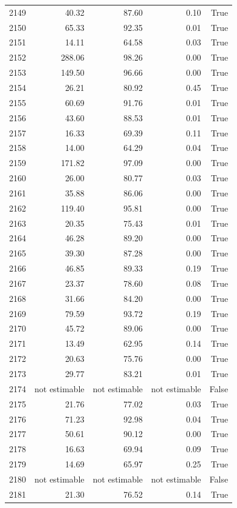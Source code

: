 \begin{longtable}{rrrrr}
2149 & 40.32 & 87.60 & 0.10 & True \\
2150 & 65.33 & 92.35 & 0.01 & True \\
2151 & 14.11 & 64.58 & 0.03 & True \\
2152 & 288.06 & 98.26 & 0.00 & True \\
2153 & 149.50 & 96.66 & 0.00 & True \\
2154 & 26.21 & 80.92 & 0.45 & True \\
2155 & 60.69 & 91.76 & 0.01 & True \\
2156 & 43.60 & 88.53 & 0.01 & True \\
2157 & 16.33 & 69.39 & 0.11 & True \\
2158 & 14.00 & 64.29 & 0.04 & True \\
2159 & 171.82 & 97.09 & 0.00 & True \\
2160 & 26.00 & 80.77 & 0.03 & True \\
2161 & 35.88 & 86.06 & 0.00 & True \\
2162 & 119.40 & 95.81 & 0.00 & True \\
2163 & 20.35 & 75.43 & 0.01 & True \\
2164 & 46.28 & 89.20 & 0.00 & True \\
2165 & 39.30 & 87.28 & 0.00 & True \\
2166 & 46.85 & 89.33 & 0.19 & True \\
2167 & 23.37 & 78.60 & 0.08 & True \\
2168 & 31.66 & 84.20 & 0.00 & True \\
2169 & 79.59 & 93.72 & 0.19 & True \\
2170 & 45.72 & 89.06 & 0.00 & True \\
2171 & 13.49 & 62.95 & 0.14 & True \\
2172 & 20.63 & 75.76 & 0.00 & True \\
2173 & 29.77 & 83.21 & 0.01 & True \\
2174 & not estimable & not estimable & not estimable & False \\
2175 & 21.76 & 77.02 & 0.03 & True \\
2176 & 71.23 & 92.98 & 0.04 & True \\
2177 & 50.61 & 90.12 & 0.00 & True \\
2178 & 16.63 & 69.94 & 0.09 & True \\
2179 & 14.69 & 65.97 & 0.25 & True \\
2180 & not estimable & not estimable & not estimable & False \\
2181 & 21.30 & 76.52 & 0.14 & True \\

\end{longtable}
